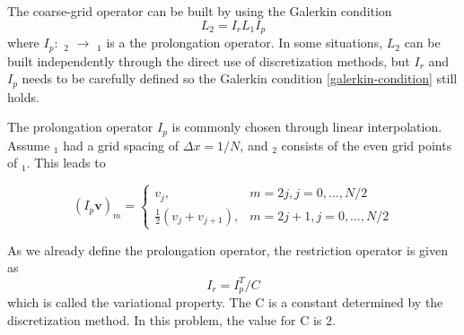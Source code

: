 The coarse-grid operator can be built by using the Galerkin condition
\begin{equation}
    L_2 = I_r L_1 I_p
    \label{galerkin-condition}
\end{equation}
where $I_p: $ \text{$\Omega$}$_2$ $\xrightarrow{}$ \text{$\Omega$}$_1$ is a the prolongation operator. In some situations, $L_2$ can be built independently through the direct use of discretization methods, but $I_r$ and $I_p$ needs to be carefully defined so the Galerkin condition \autoref{galerkin-condition} still holds.

The prolongation operator $I_p$ is commonly chosen through linear interpolation. Assume \text{$\Omega$}$_1$ had a grid spacing of $\Delta x = 1/N$, and \text{$\Omega$}$_2$ consists of the even grid points of \text{$\Omega$}$_1$. This leads to 

\begin{equation}
    (I_p \mathbf{v})_m= 
\begin{cases}
    v_j,& m = 2j, j = 0,\dots,N/2 \\
    \frac{1}{2} (v_j + v_{j+1}),              & m = 2j + 1, j = 0,\dots,N/2
\end{cases}
\end{equation}

As we already define the prolongation operator, the restriction operator is given as 
\begin{equation}
    I_r = I_p^T / C
\end{equation}
which is called the variational property. The C is a constant determined by the discretization method. In this problem, the value for C is 2.

